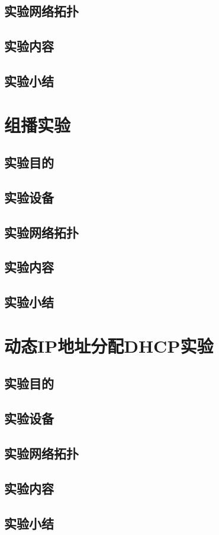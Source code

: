 \documentclass[lang=cn,11pt,a4paper,cite=authoryear]{elegantpaper}
\begin{document}
\subsection{实验网络拓扑}
\subsection{实验内容}
\subsection{实验小结}
\section{组播实验}
\subsection{实验目的}
\subsection{实验设备}
\subsection{实验网络拓扑}
\subsection{实验内容}
\subsection{实验小结}
\section{动态IP地址分配DHCP实验}
\subsection{实验目的}
\subsection{实验设备}
\subsection{实验网络拓扑}
\subsection{实验内容}
\subsection{实验小结}
\end{document}
